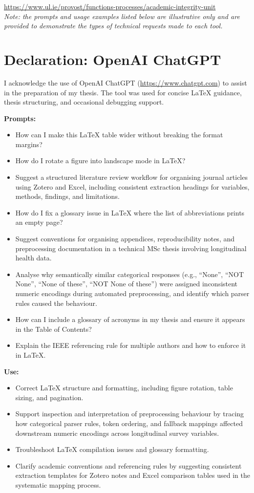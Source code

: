 \url{https://www.ul.ie/provost/functions-processes/academic-integrity-unit}\\
\noindent\textit{Note: the prompts and usage examples listed below are illustrative only and are provided to demonstrate the types of technical requests made to each tool.}

\section*{Declaration: OpenAI ChatGPT}
I acknowledge the use of OpenAI ChatGPT (\url{https://www.chatgpt.com}) to assist in the preparation of my thesis. The tool was used for concise LaTeX guidance, thesis structuring, and occasional debugging support.

\textbf{Prompts:}
\begin{itemize}
    \item[-] How can I make this LaTeX table wider without breaking the format margins?
    \item[-] How do I rotate a figure into landscape mode in LaTeX?
    \item[-] Suggest a structured literature review workflow for organising journal articles using Zotero and Excel, including consistent extraction headings for variables, methods, findings, and limitations.
    \item[-] How do I fix a glossary issue in LaTeX where the list of abbreviations prints an empty page?
    \item[-] Suggest conventions for organising appendices, reproducibility notes, and preprocessing documentation in a technical MSc thesis involving longitudinal health data.
    \item[-] Analyse why semantically similar categorical responses (e.g., “None”, “NOT None”, “None of these”, “NOT None of these”) were assigned inconsistent numeric encodings during automated preprocessing, and identify which parser rules caused the behaviour.
    \item[-] How can I include a glossary of acronyms in my thesis and ensure it appears in the Table of Contents?
    \item[-] Explain the IEEE referencing rule for multiple authors and how to enforce it in LaTeX.
\end{itemize}

\textbf{Use:}
\begin{itemize}
    \item[-] Correct LaTeX structure and formatting, including figure rotation, table sizing, and pagination.
    \item[-] Support inspection and interpretation of preprocessing behaviour by tracing how categorical parser rules, token ordering, and fallback mappings affected downstream numeric encodings across longitudinal survey variables.
    \item[-] Troubleshoot LaTeX compilation issues and glossary formatting.
    \item[-] Clarify academic conventions and referencing rules by suggesting consistent extraction templates for Zotero notes and Excel comparison tables used in the systematic mapping process.
\end{itemize}


